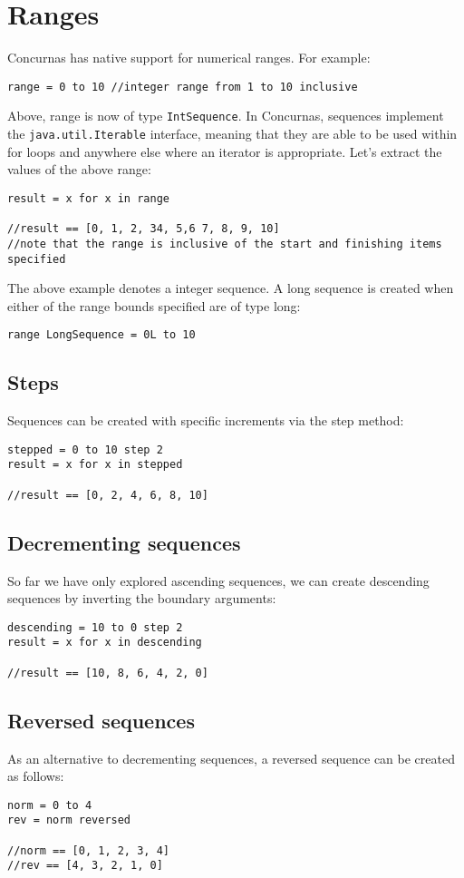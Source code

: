 \documentclass[conc-doc]{subfiles}
\begin{document}
	
	\chapter[Ranges]{Ranges}

Concurnas has native support for numerical ranges. For example:
\begin{lstlisting}
range = 0 to 10 //integer range from 1 to 10 inclusive
\end{lstlisting}

Above, range is now of type \lstinline{IntSequence}. In Concurnas, sequences implement the \lstinline{java.util.Iterable} interface, meaning that they are able to be used within for loops and anywhere else where an iterator is appropriate. Let’s extract the values of the above range:
\begin{lstlisting}
result = x for x in range 

//result == [0, 1, 2, 34, 5,6 7, 8, 9, 10]
//note that the range is inclusive of the start and finishing items specified
\end{lstlisting}

The above example denotes a integer sequence. A long sequence is created when either of the range bounds specified are of type long:
\begin{lstlisting}
range LongSequence = 0L to 10
\end{lstlisting}

\section{Steps}
Sequences can be created with specific increments via the step method:
\begin{lstlisting}
stepped = 0 to 10 step 2
result = x for x in stepped 

//result == [0, 2, 4, 6, 8, 10]
\end{lstlisting}

\section{Decrementing sequences}
So far we have only explored ascending sequences, we can create descending sequences by inverting the boundary arguments:
\begin{lstlisting}
descending = 10 to 0 step 2
result = x for x in descending 

//result == [10, 8, 6, 4, 2, 0]
\end{lstlisting}

\section{Reversed sequences}
As an alternative to decrementing sequences, a reversed sequence can be created as follows:
\begin{lstlisting}
norm = 0 to 4
rev = norm reversed

//norm == [0, 1, 2, 3, 4]
//rev == [4, 3, 2, 1, 0]
\end{lstlisting}
\end{document}
